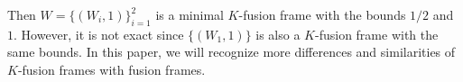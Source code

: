 \documentclass{birkjour}
\newtheorem{lem}[thm]{Lemma}
\newtheorem{prop}[thm]{Proposition}
\theoremstyle{definition}
\theoremstyle{remark}
\numberwithin{equation}{section}
\begin{document}
Then $W=\{(W_{i}, 1)\}_{i=1}^{2}$ is a minimal $K$-fusion frame with the bounds $1/2$ and  $1$. However,  it is not exact  since $\{(W_{1}, 1)\}$ is also a $K$-fusion frame with the same  bounds. In this paper, we will recognize  more differences and similarities of $K$-fusion frames with fusion frames.
\end{document}
